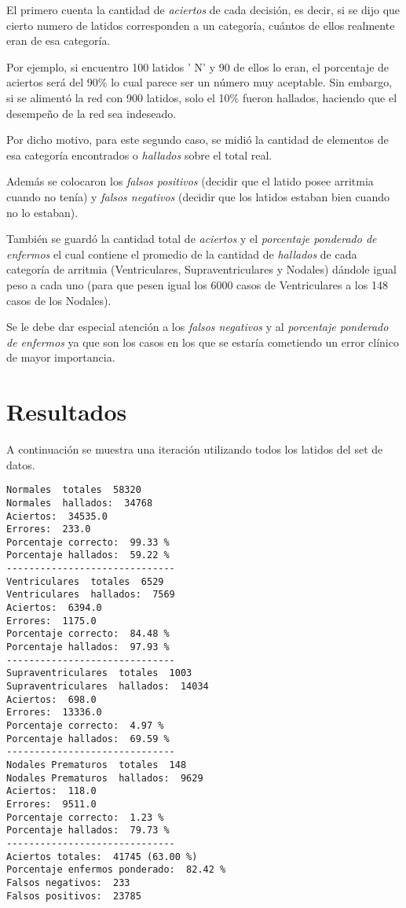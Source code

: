 \documentclass[conference]{IEEEtran}
\theoremstyle{definition}
\begin{document}
El primero cuenta la cantidad de \textit{aciertos} de cada decisi\'{o}n, es decir, si se dijo que cierto numero de latidos corresponden a un categor\'{i}a, cu\'{a}ntos de ellos realmente eran de esa categor\'{i}a.

Por ejemplo, si encuentro 100 latidos ' N' y 90 de ellos lo eran, el porcentaje de aciertos ser\'{a} del 90\% lo cual parece ser un n\'{u}mero muy aceptable. Sin embargo, si se aliment\'{o} la red con 900 latidos, solo el 10\% fueron hallados, haciendo que el desempe\~{n}o de la red sea indeseado.

Por dicho motivo, para este segundo caso, se midi\'{o} la cantidad de elementos de esa categor\'{i}a encontrados o \textit{hallados} sobre el total real.

Adem\'{a}s se colocaron los \textit{falsos positivos} (decidir que el latido posee arritmia cuando no ten\'{i}a) y \textit{falsos negativos} (decidir que los latidos estaban bien cuando no lo estaban).

Tambi\'{e}n se guard\'{o} la cantidad total de \textit{aciertos} y el \textit{porcentaje ponderado de enfermos} el cual contiene el promedio de la cantidad de \textit{hallados} de cada categor\'{i}a de arritmia (Ventriculares, Supraventriculares y Nodales) d\'{a}ndole igual peso a cada uno (para que pesen igual los 6000 casos de Ventriculares a los 148 casos de los Nodales).

Se le debe dar especial atenci\'{o}n a los \textit{falsos negativos} y al \textit{porcentaje ponderado de enfermos} ya que son los casos en los que se estar\'{i}a cometiendo un error cl\'{i}nico de mayor importancia. 

\section{Resultados}

A continuaci\'{o}n se muestra una iteraci\'{o}n utilizando todos los latidos del set de datos.

\begin{lstlisting}[frame=single]
Normales  totales  58320
Normales  hallados:  34768
Aciertos:  34535.0
Errores:  233.0
Porcentaje correcto:  99.33 %
Porcentaje hallados:  59.22 %
------------------------------
Ventriculares  totales  6529
Ventriculares  hallados:  7569
Aciertos:  6394.0
Errores:  1175.0
Porcentaje correcto:  84.48 %
Porcentaje hallados:  97.93 %
------------------------------
Supraventriculares  totales  1003
Supraventriculares  hallados:  14034
Aciertos:  698.0
Errores:  13336.0
Porcentaje correcto:  4.97 %
Porcentaje hallados:  69.59 %
------------------------------
Nodales Prematuros  totales  148
Nodales Prematuros  hallados:  9629
Aciertos:  118.0
Errores:  9511.0
Porcentaje correcto:  1.23 %
Porcentaje hallados:  79.73 %
------------------------------
Aciertos totales:  41745 (63.00 %)
Porcentaje enfermos ponderado:  82.42 %
Falsos negativos:  233
Falsos positivos:  23785
\end{lstlisting}
\end{document}
